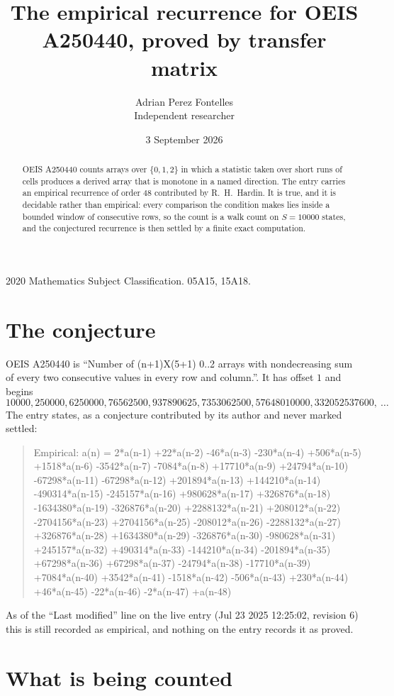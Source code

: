 \documentclass[11pt,a4paper]{article}
\title{The empirical recurrence for OEIS A250440, proved by transfer matrix}
\author{Adrian Perez Fontelles\\ \small Independent researcher}
\date{3 September 2026}
\theoremstyle{plain}
\theoremstyle{definition}
\begin{document}
\maketitle

\begin{abstract}
OEIS A250440 counts arrays over $\{0,1,2\}$ in which a statistic taken over short runs
of cells produces a derived array that is monotone in a named direction. The entry carries an
empirical recurrence of order $48$ contributed by R.~H.~Hardin. It is true, and it is
decidable rather than empirical: every comparison the condition makes lies inside a bounded
window of consecutive rows, so the count is a walk count on $S=10000$ states, and the
conjectured recurrence is then settled by a finite exact computation.
\end{abstract}

\noindent\small 2020 Mathematics Subject Classification. 05A15, 15A18.\normalsize

\section{The conjecture}

OEIS A250440 is ``Number of (n+1)X(5+1) 0..2 arrays with nondecreasing sum of every two consecutive values in every row and column.''. It has offset $1$ and begins
\[
10000, 250000, 6250000, 76562500, 937890625, 7353062500, 57648010000, 332052537600,\ \dots
\]
The entry states, as a conjecture contributed by its author and never marked settled:
\begin{quote}
Empirical: a(n) = 2*a(n-1) +22*a(n-2) -46*a(n-3) -230*a(n-4) +506*a(n-5) +1518*a(n-6) -3542*a(n-7) -7084*a(n-8) +17710*a(n-9) +24794*a(n-10) -67298*a(n-11) -67298*a(n-12) +201894*a(n-13) +144210*a(n-14) -490314*a(n-15) -245157*a(n-16) +980628*a(n-17) +326876*a(n-18) -1634380*a(n-19) -326876*a(n-20) +2288132*a(n-21) +208012*a(n-22) -2704156*a(n-23) +2704156*a(n-25) -208012*a(n-26) -2288132*a(n-27) +326876*a(n-28) +1634380*a(n-29) -326876*a(n-30) -980628*a(n-31) +245157*a(n-32) +490314*a(n-33) -144210*a(n-34) -201894*a(n-35) +67298*a(n-36) +67298*a(n-37) -24794*a(n-38) -17710*a(n-39) +7084*a(n-40) +3542*a(n-41) -1518*a(n-42) -506*a(n-43) +230*a(n-44) +46*a(n-45) -22*a(n-46) -2*a(n-47) +a(n-48)
\end{quote}
As of the ``Last modified'' line on the live entry (Jul 23 2025 12:25:02, revision 6) this is still
recorded as empirical, and nothing on the entry records it as proved.

\section{What is being counted}
\end{document}
